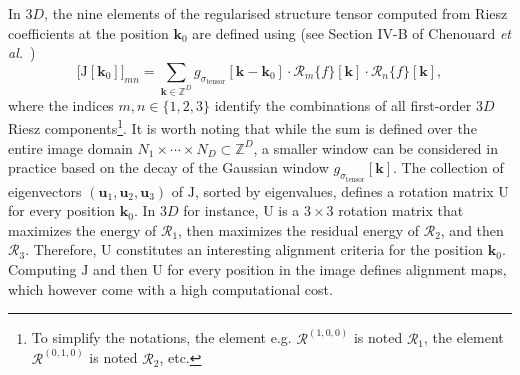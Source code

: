 \documentclass[fleqn,a4paper,oneside,openany]{book}
\begin{document}
In 3$D$, the nine elements of the regularised structure tensor computed from Riesz coefficients at the position $\boldsymbol{k}_0$ are defined using (see Section IV-B of Chenouard \textit{et al.}~\cite{ChU2012})
\begin{equation}\label{eq:structureTensor}
\Big[\mathrm{J}[\boldsymbol{k}_0]\Big]_{mn}=
\sum_{\boldsymbol{k}\in\mathbb{Z}^D} g_{\sigma_{\text{tensor}}}[\boldsymbol{k}-\boldsymbol{k}_0]\cdot
\mathcal{R}_m\{f\}[\boldsymbol{k}]\cdot\mathcal{R}_n\{f\}[\boldsymbol{k}],
\end{equation}
%
where the indices $m,n\in\{1,2,3\}$ identify the combinations of all first-order 3$D$ Riesz components\footnote{To simplify the notations, the element e.g. $\mathcal{R}^{(1,0,0)}$ is noted $\mathcal{R}_1$, the element $\mathcal{R}^{(0,1,0)}$ is noted $\mathcal{R}_2$, etc.}.
It is worth noting that while the sum is defined over the entire image domain $N_1\times\cdots\times N_D\subset\mathbb{Z}^D$, a smaller window can be considered in practice based on the decay of the Gaussian window $g_{\sigma_{\text{tensor}}}[\boldsymbol{k}]$.
The collection of eigenvectors $(\boldsymbol{u}_1,\boldsymbol{u}_2,\boldsymbol{u}_3)$ of $\mathrm{J}$, sorted by eigenvalues, defines a rotation matrix $\mathrm{U}$ for every position $\boldsymbol{k}_0$.
In 3$D$ for instance, $\mathrm{U}$ is a $3\times 3$ rotation matrix that maximizes the energy of $\mathcal{R}_1$, then maximizes the residual energy of $\mathcal{R}_2$, and then $\mathcal{R}_3$.
Therefore, $\mathrm{U}$ constitutes an interesting alignment criteria for the position $\boldsymbol{k}_0$.
Computing $\mathrm{J}$ and then $\mathrm{U}$ for every position in the image defines alignment maps, which however come with a high computational cost.
\end{document}
